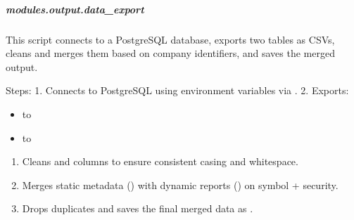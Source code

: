 \documentclass[letterpaper,10pt,english]{sphinxmanual}
\begin{document}

\begin{fulllineitems}
\label{\detokenize{autoapi/modules/output/data_clean/index:id5}}
\pysigstartsignatures
\pysigline
{}
\pysigstopsignatures
\end{fulllineitems}


\sphinxstepscope


\subparagraph{modules.output.data\_export}
\label{\detokenize{autoapi/modules/output/data_export/index:module-modules.output.data_export}}\label{\detokenize{autoapi/modules/output/data_export/index:modules-output-data-export}}\label{\detokenize{autoapi/modules/output/data_export/index::doc}}
\sphinxAtStartPar
This script connects to a PostgreSQL database, exports two tables as CSVs,
cleans and merges them based on company identifiers, and saves the merged output.

\sphinxAtStartPar
Steps:
1. Connects to PostgreSQL using environment variables via .
2. Exports:
\begin{itemize}
\item {} 
\sphinxAtStartPar
{} to 

\item {} 
\sphinxAtStartPar
{} to 

\end{itemize}
\begin{enumerate}
%
\setcounter{enumi}{2}
\item {} 
\sphinxAtStartPar
Cleans  and  columns to ensure consistent casing and whitespace.

\item {} 
\sphinxAtStartPar
Merges static metadata () with dynamic reports () on symbol + security.

\item {} 
\sphinxAtStartPar
Drops duplicates and saves the final merged data as .

\end{enumerate}
\end{document}

